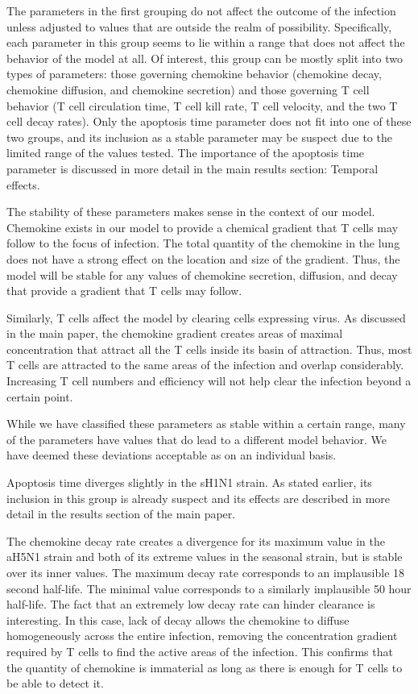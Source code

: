 \documentclass[10pt]{article}
\begin{document}
The parameters in the first grouping do not affect the outcome of the infection unless adjusted to values that are outside the realm of possibility.  Specifically, each parameter in this group seems to lie within a range that does not affect the behavior of the model at all.  Of interest, this group can be mostly split into two types of parameters: those governing chemokine behavior (chemokine decay, chemokine diffusion, and chemokine secretion) and those governing T cell behavior (T cell circulation time, T cell kill rate, T cell velocity, and the two T cell decay rates).  Only the apoptosis time parameter does not fit into one of these two groups, and its inclusion as a stable parameter may be suspect due to the limited range of the values tested.  The importance of the apoptosis time parameter is discussed in more detail in the main results section: Temporal effects.  

The stability of these parameters makes sense in the context of our model.  Chemokine exists in our model to provide a chemical gradient that T cells may follow to the focus of infection.  The total quantity of the chemokine in the lung does not have a strong effect on the location and size of the gradient.  Thus, the model will be stable for any values of chemokine secretion, diffusion, and decay that provide a gradient that T cells may follow.

Similarly, T cells affect the model by clearing cells expressing virus.  As discussed in the main paper, the chemokine gradient creates areas of maximal concentration that attract all the T cells inside its basin of attraction.  Thus, most T cells are attracted to the same areas of the infection and overlap considerably.  Increasing T cell numbers and efficiency will not help clear the infection beyond a certain point.

While we have classified these parameters as stable within a certain range, many of the parameters have values that do lead to a different model behavior.  We have deemed these deviations acceptable as on an individual basis.

Apoptosis time diverges slightly in the sH1N1 strain.  As stated earlier, its inclusion in this group is already suspect and its effects are described in more detail in the results section of the main paper.

The chemokine decay rate creates a divergence for its maximum value in the aH5N1 strain and both of its extreme values in the seasonal strain, but is stable over its inner values.  The maximum decay rate corresponds to an implausible 18 second half-life.  The minimal value corresponds to a similarly implausible 50 hour half-life.  The fact that an extremely low decay rate can hinder clearance is interesting.  In this case, lack of decay allows the chemokine to diffuse homogeneously across the entire infection, removing the concentration gradient required by T cells to find the active areas of the infection.  This confirms that the quantity of chemokine is immaterial as long as there is enough for T cells to be able to detect it.
\end{document}
